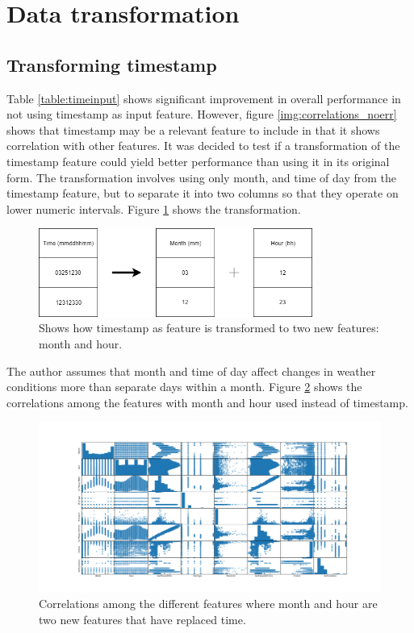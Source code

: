 \section{Data transformation} \label{sec:transformation}

	\subsection{Transforming timestamp}

	Table \ref{table:timeinput} shows significant improvement in overall performance in not using timestamp as input feature. However, figure \ref{img:correlations_noerr} shows that timestamp may be a relevant feature to include in that it shows correlation with other features. It was decided to test if a transformation of the timestamp feature could yield better performance than using it in its original form. The transformation involves using only month, and time of day from the timestamp feature, but to separate it into two columns so that they operate on lower numeric intervals. Figure \ref{img:transformation} shows the transformation. 

\begin{figure}[H] 
	\centering
	\includegraphics[width=0.8\textwidth]{media/transformation_time.png}
	\caption{Shows how timestamp as feature is transformed to two new features: month and hour.}
	\label{img:transformation}
\end{figure}

	The author assumes that month and time of day affect changes in weather conditions more than separate days within a month. Figure \ref{img:correlations_featureengi} shows the correlations among the features with month and hour used instead of timestamp. 

\begin{figure}[H] 
	\centering
	\includegraphics[width=1\textwidth]{media/correlations_featureengi_ver5.png}
	\caption{Correlations among the different features where month and hour are two new features that have replaced time. }
	\label{img:correlations_featureengi}
\end{figure}

